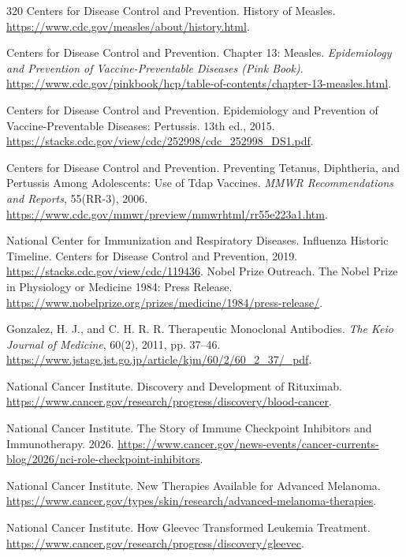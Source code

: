 \documentclass[12pt,oneside]{book}
\begin{document}
\begin{thebibliography}{320}
Centers for Disease Control and Prevention. History of Measles.
\url{https://www.cdc.gov/measles/about/history.html}.

Centers for Disease Control and Prevention. Chapter 13: Measles.
\emph{Epidemiology and Prevention of Vaccine-Preventable Diseases (Pink Book)}.
\url{https://www.cdc.gov/pinkbook/hcp/table-of-contents/chapter-13-measles.html}.

Centers for Disease Control and Prevention. Epidemiology and Prevention of
Vaccine-Preventable Diseases: Pertussis. 13th ed., 2015.
\url{https://stacks.cdc.gov/view/cdc/252998/cdc_252998_DS1.pdf}.

Centers for Disease Control and Prevention. Preventing Tetanus, Diphtheria,
and Pertussis Among Adolescents: Use of Tdap Vaccines. \emph{MMWR
Recommendations and Reports}, 55(RR-3), 2006.
\url{https://www.cdc.gov/mmwr/preview/mmwrhtml/rr55e223a1.htm}.

National Center for Immunization and Respiratory Diseases. Influenza
Historic Timeline. Centers for Disease Control and Prevention, 2019.
\url{https://stacks.cdc.gov/view/cdc/119436}.
Nobel Prize Outreach. The Nobel Prize in Physiology or Medicine 1984:
Press Release.
\url{https://www.nobelprize.org/prizes/medicine/1984/press-release/}.

Gonzalez, H. J., and C. H. R. R. Therapeutic Monoclonal Antibodies.
\emph{The Keio Journal of Medicine}, 60(2), 2011, pp. 37--46.
\url{https://www.jstage.jst.go.jp/article/kjm/60/2/60_2_37/_pdf}.

National Cancer Institute. Discovery and Development of Rituximab.
\url{https://www.cancer.gov/research/progress/discovery/blood-cancer}.

National Cancer Institute. The Story of Immune Checkpoint Inhibitors and
Immunotherapy. 2026.
\url{https://www.cancer.gov/news-events/cancer-currents-blog/2026/nci-role-checkpoint-inhibitors}.

National Cancer Institute. New Therapies Available for Advanced Melanoma.
\url{https://www.cancer.gov/types/skin/research/advanced-melanoma-therapies}.

National Cancer Institute. How Gleevec Transformed Leukemia Treatment.
\url{https://www.cancer.gov/research/progress/discovery/gleevec}.


\end{thebibliography}
\end{document}
